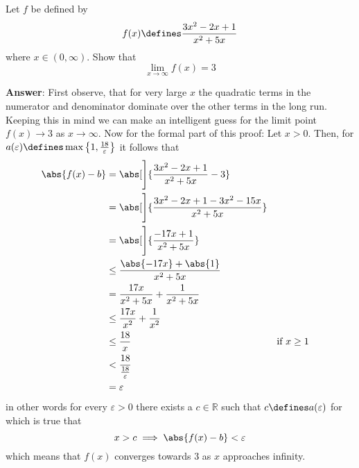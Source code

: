 \begin{exm}\label{exm-infinity-limit:1}
	Let $f$ be defined by \cite[p.71]{wuest2009}
	\begin{equation*}
		f(x)\defines\frac{3x^2-2x+1}{x^2+5x}
	\end{equation*}
	where $x\in(0,\infty)$. Show that
	\begin{equation*}
		\lim_{x \to \infty}f(x)=3
	\end{equation*}
	\begin{flushleft}
		\textbf{Answer}: First observe, that for very large $x$ the quadratic terms
		in the numerator and denominator dominate over the other terms in the long
		run. Keeping this in mind we can make an intelligent guess for the limit point
		$f(x) \to 3$ as $x \to \infty$. Now for the formal part of this proof: Let $x>0$.
		Then, for $a(\varepsilon)\defines\max\left\{1,\tfrac{18}{\varepsilon}\right\}$ it
		follows that
		\begin{align*}
			\abs{f(x) - b} & = \abs[\Bigg]{\frac{3x^2-2x+1}{x^2+5x}-3}                               \\
			               & = \abs[\Bigg]{\frac{3x^2-2x+1-3x^2-15x}{x^2+5x}}                        \\
			               & = \abs[\Bigg]{\frac{-17x+1}{x^2+5x}}                                    \\
			               & \leq {\frac{\abs{-17x}+\abs{1}}{x^2+5x}}                                \\
			               & = \frac{17x}{x^2+5x} + \frac{1}{x^2+5x}                                 \\
			               & \leq \frac{17x}{x^2} + \frac{1}{x^2}                                    \\
			               & \leq \frac{18}{x}                                &  & \text{if } x\geq1 \\
			               & < \frac{18}{\tfrac{18}{\varepsilon}}                                    \\
			               & = \varepsilon
		\end{align*}
		in other words for every $\varepsilon>0$ there exists a $c\in\mathbb{R}$
		such that $c\defines a(\varepsilon)$ for which is true that
		\begin{equation*}
			x>c \implies \abs{f(x)-b}<\varepsilon
		\end{equation*}
		which means that $f(x)$ converges towards $3$ as $x$ approaches infinity.
	\end{flushleft}
\end{exm}

